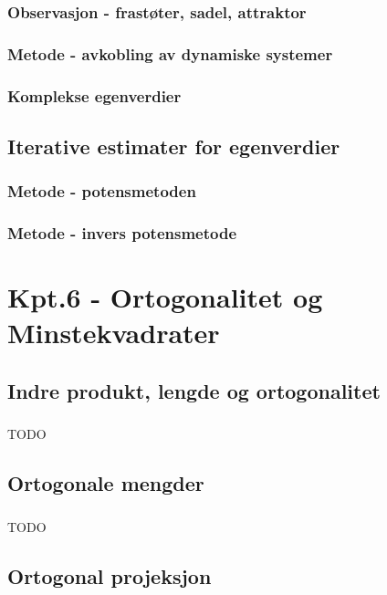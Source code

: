 \documentclass{article}
\begin{document}
      \subsubsection{Observasjon - frastøter, sadel, attraktor}
        
      \subsubsection{Metode - avkobling av dynamiske systemer}
        
      \subsubsection{Komplekse egenverdier}
        
    \subsection{Iterative estimater for egenverdier}
      \subsubsection{Metode - potensmetoden}
        
      \subsubsection{Metode - invers potensmetode}
        
  \section{Kpt.6 - Ortogonalitet og Minstekvadrater}
    \subsection{Indre produkt, lengde og ortogonalitet}
      \subsubsection{}
        TODO
    \subsection{Ortogonale mengder}
      \subsubsection{}
        TODO
    \subsection{Ortogonal projeksjon}
\end{document}
